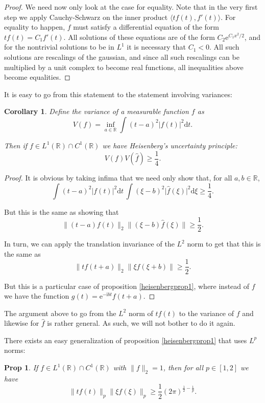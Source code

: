\documentclass{amsart}
\newcommand{\R}{\mathbb{R}}
\newcommand{\dd}{\mathrm{d}}
\newcommand{\e}{\mathrm{e}}
\newcommand{\I}{\mathrm{i}}
\newtheorem{prop}{Prop}
\newtheorem{cor}{Corollary}[prop]
\begin{document}
\begin{proof}
We need now only look at the case for equality. Note that in the very first step we apply Cauchy-Schwarz on the inner product $\langle t f(t), f'(t) \rangle$. For equality to happen, $f$ must satisfy a differential equation of the form $t f(t) = C_1 f'(t)$. All solutions of these equations are of the form $C_2 \e^{C_1 x^2 / 2}$, and for the nontrivial solutions to be in $L^1$ it is necessary that $C_1 < 0$. All such solutions are rescalings of the gaussian, and since all such rescalings can be multiplied by a unit complex to become real functions, all inequalities above become equalities.
\end{proof}

It is easy to go from this statement to the statement involving variances:

\begin{cor}
Define the variance of a measurable function $f$ as
\[V(f) = \inf_{a \in \R} \int (t - a)^2 \lvert f(t) \rvert^2 \dd t.\]

Then if $f \in L^1(\R) \cap C^1(\R)$ we have Heisenberg's uncertainty principle:
\[V(f) V(\hat f) \geq \frac14.\]
\end{cor}

\begin{proof}
It is obvious by taking infima that we need only show that, for all $a, b \in \R$,
\[\int (t - a)^2 \lvert f(t) \rvert^2 \dd t \, \int (\xi - b)^2 \lvert \hat f(\xi) \rvert^2 \dd \xi \geq \frac14.\]

But this is the same as showing that
\[ \lVert (t-a) f(t) \rVert_2 \lVert (\xi - b) \hat f(\xi) \rVert \geq \frac12.\]

In turn, we can apply the translation invariance of the $L^2$ norm to get that this is the same as
\[ \lVert t f(t+a) \rVert_2 \lVert \xi \hat f(\xi+b) \rVert \geq \frac12.\]

But this is a particular case of proposition \ref{heisenbergprop1}, where instead of $f$ we have the function $g(t) = \e^{- \I b t} f(t+a)$.
\end{proof}

The argument above to go from the $L^2$ norm of $t f(t)$ to the variance of $f$ and likewise for $\hat f$ is rather general. As such, we will not bother to do it again.

There exists an easy generalization of proposition \ref{heisenbergprop1} that uses $L^p$ norms:

\begin{prop}
If $f \in L^1(\R) \cap C^1(\R)$ with $\lVert f \rVert_2 = 1$, then for all $p \in [1,2]$ we have
\[\lVert t f(t) \rVert_p \lVert \xi f(\xi) \rVert_{p} \geq \frac12 (2 \pi)^{\frac12 - \frac1p}.\]
\end{prop}
\end{document}
